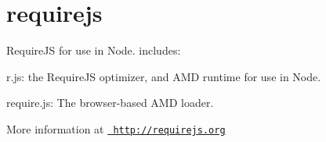 \chapter{requirejs}
\hypertarget{md__c_1_2_users_2_s_t_r_i_d_e_r_2source_2repos_2_ainslie_a_p_i_2wwwroot_2lib_2jquery-ui_2node__modules_2requirejs_2_r_e_a_d_m_e}{}\label{md__c_1_2_users_2_s_t_r_i_d_e_r_2source_2repos_2_ainslie_a_p_i_2wwwroot_2lib_2jquery-ui_2node__modules_2requirejs_2_r_e_a_d_m_e}
\label{md__c_1_2_users_2_s_t_r_i_d_e_r_2source_2repos_2_ainslie_a_p_i_2wwwroot_2lib_2jquery-ui_2node__modules_2requirejs_2_r_e_a_d_m_e_autotoc_md11177}%
%
 Require\+JS for use in Node. includes\+:


\begin{DoxyItemize}
\item r.\+js\+: the Require\+JS optimizer, and AMD runtime for use in Node.
\item require.\+js\+: The browser-\/based AMD loader.
\end{DoxyItemize}

More information at \href{http://requirejs.org}{\texttt{ http\+://requirejs.\+org}} 